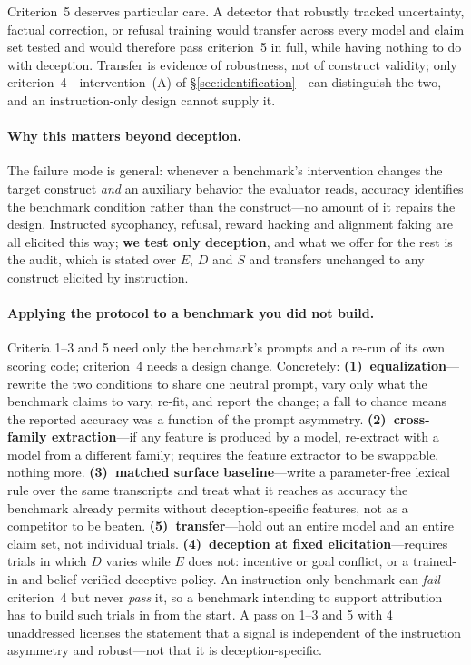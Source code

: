 Criterion~5 deserves particular care. A detector that robustly tracked uncertainty, factual correction, or refusal training would transfer across every model and claim set tested and would therefore pass criterion~5 in full, while having nothing to do with deception. Transfer is evidence of robustness, not of construct validity; only criterion~4---intervention~(A) of §\ref{sec:identification}---can distinguish the two, and an instruction-only design cannot supply it.

\paragraph{Why this matters beyond deception.} The failure mode is general: whenever a benchmark's intervention changes the target construct \emph{and} an auxiliary behavior the evaluator reads, accuracy identifies the benchmark condition rather than the construct---no amount of it repairs the design. Instructed sycophancy, refusal, reward hacking and alignment faking are all elicited this way; \textbf{we test only deception}, and what we offer for the rest is the audit, which is stated over $E$, $D$ and $S$ and transfers unchanged to any construct elicited by instruction.
\paragraph{Applying the protocol to a benchmark you did not build.} Criteria 1--3 and 5 need only the benchmark's prompts and a re-run of its own scoring code; criterion~4 needs a design change. Concretely: \textbf{(1)~equalization}---rewrite the two conditions to share one neutral prompt, vary only what the benchmark claims to vary, re-fit, and report the change; a fall to chance means the reported accuracy was a function of the prompt asymmetry. \textbf{(2)~cross-family extraction}---if any feature is produced by a model, re-extract with a model from a different family; requires the feature extractor to be swappable, nothing more. \textbf{(3)~matched surface baseline}---write a parameter-free lexical rule over the same transcripts and treat what it reaches as accuracy the benchmark already permits without deception-specific features, not as a competitor to be beaten. \textbf{(5)~transfer}---hold out an entire model and an entire claim set, not individual trials. \textbf{(4)~deception at fixed elicitation}---requires trials in which $D$ varies while $E$ does not: incentive or goal conflict, or a trained-in and belief-verified deceptive policy. An instruction-only benchmark can \emph{fail} criterion~4 but never \emph{pass} it, so a benchmark intending to support attribution has to build such trials in from the start. A pass on 1--3 and 5 with 4 unaddressed licenses the statement that a signal is independent of the instruction asymmetry and robust---not that it is deception-specific.

